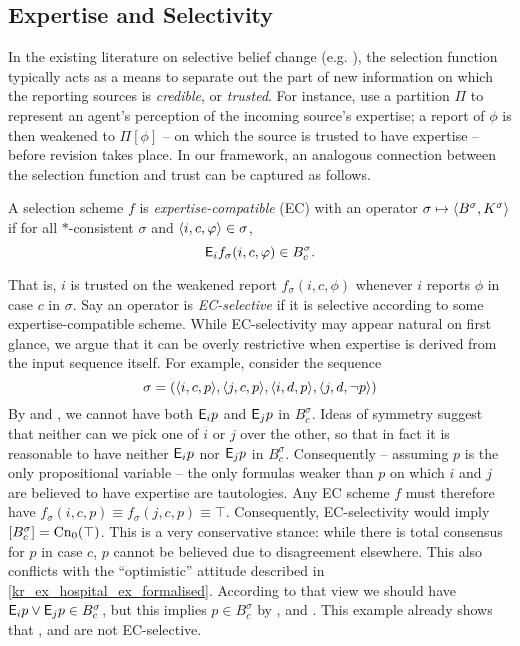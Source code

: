 \subsection{Expertise and Selectivity}
\label{kr_sec_expertise_and_selectivity}

In the existing literature on selective belief change (e.g.
\cite{ferme1999selective,booth_trust_2018}), the selection function typically
acts as a means to separate out the part of new information on which the
reporting sources is \emph{credible}, or \emph{trusted}. For instance,
\textcite{booth_trust_2018} use a partition $\Pi$ to represent an agent's
perception of the incoming source's expertise; a report of $\phi$ is then
weakened to $\Pi[\phi]$ -- on which the source is trusted to have expertise --
before revision takes place. In our framework, an analogous connection between
the selection function and trust can be captured as follows.

\begin{definition}
    \label{kr_def_ec_scheme}
    A selection scheme $f$ is \emph{expertise-compatible} (EC) with an operator
    $\sigma \mapsto \langle {B^\sigma, K^\sigma} \rangle$ if for all $\ast$-consistent
    $\sigma$ and $\langle {i, c, \varphi} \rangle \in \sigma$,
    \[
        \mathsf{E}_i{f_\sigma(i, c, \varphi)} \in B^\sigma_c.
    \]
\end{definition}

That is, $i$ is trusted on the weakened report $f_\sigma(i, c, \phi)$ whenever
$i$ reports $\phi$ in case $c$ in $\sigma$.
%
Say an operator is \emph{EC-selective} if it is selective according to some
expertise-compatible scheme. While EC-selectivity may appear natural on first
glance, we argue that it can be overly restrictive when expertise is derived
from the input sequence itself. For example, consider the sequence
\[
    \sigma = (
        \langle {i, c, p} \rangle,
        \langle {j, c, p} \rangle,
        \langle {i, d, p} \rangle,
        \langle {j, d, \neg p} \rangle
    )
\]
By \soundness{} and \closure{}, we cannot have both $\mathsf{E}_i{p}$ and $\mathsf{E}_j{p}$ in
$B^\sigma_c$. Ideas of symmetry suggest that neither can we pick one of $i$ or
$j$ over the other, so that in fact it is reasonable to have neither $\mathsf{E}_i{p}$
nor $\mathsf{E}_j{p}$ in $B^\sigma_c$. Consequently -- assuming $p$ is the only
propositional variable -- the only formulas weaker than $p$ on which $i$ and
$j$ are believed to have expertise are tautologies. Any EC scheme $f$ must
therefore have $f_\sigma(i, c, p) \equiv f_\sigma(j, c, p) \equiv \top$.
Consequently, EC-selectivity would imply $\left[{B^\sigma_c}\right] =
\operatorname{Cn}_0(\top)$. This is a very conservative stance: while there is total
consensus for $p$ in case $c$, $p$ cannot be believed due to disagreement
elsewhere. This also conflicts with the ``optimistic'' attitude described in
\cref{kr_ex_hospital_ex_formalised}. According to that view we should have
$\mathsf{E}_i{p}
\lor \mathsf{E}_j{p} \in B^\sigma_c$, but this implies $p \in B^\sigma_c$ by
\soundness{}, \containment{} and \closure{}.
%
This example already shows that \varbasedcond{}, \partbasedcond{} and
\scorebasedop{} are not EC-selective.

